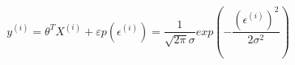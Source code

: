 
\begin{equation}
y^{\left(i\right)}=\theta^T X^{\left(i\right)} + \varepsilon
p\left(\epsilon^{\left(i\right)}\right)=\frac{1}{\sqrt{2\pi}\sigma}exp\left(-\frac{\left(\epsilon^{\left(i\right)}\right)^2}{2\sigma^2}\right)
\end{equation}
